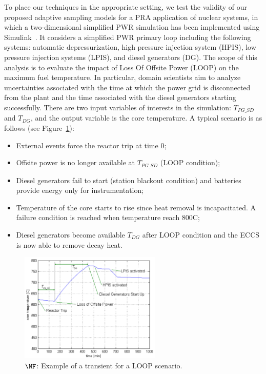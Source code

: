 To place our techniques in the appropriate setting, we test the validity of our proposed adaptive sampling models for a PRA application of nuclear systems, in which a two-dimensional simplified PWR simulation has been implemented using Simulink~\cite{MandelliSmith2012}.
%
It considers a simplified PWR primary loop including the following systems: automatic depressurization, high pressure injection system (HPIS), low pressure injection systems (LPIS), and diesel generators (DG).
%
The scope of this analysis is to evaluate the impact of Loss Of Offsite Power (LOOP) on the maximum fuel temperature.
%
In particular, domain scientists aim to analyze uncertainties associated with the time at which the power grid is disconnected from the plant and the time associated with the diesel generators starting successfully.
%
There are two input variables of interests in the simulation: $T_{PG\_SD}$ and $T_{DG}$, and the output variable is the core temperature.
%
A typical scenario is as follows (see Figure~\ref{fig:nuclearTransient}):
\begin{itemize} \denselist
  \item External events force the reactor trip at time $0$;
  \item Offsite power is no longer available at $T_{PG\_SD}$ (LOOP condition);
  \item Diesel generators fail to start (station blackout condition) and batteries provide energy only for instrumentation;
  \item Temperature of the core starts to rise since heat removal is incapacitated. A failure condition is reached when temperature reach 800C;
  \item Diesel generators become available $T_{DG}$ after LOOP condition and the ECCS is now able to remove decay heat.
\end{itemize}

\begin{figure}[!ht]
\centering
\includegraphics[width=0.6\textwidth]{figs/chap5/scenExample.pdf}
\caption{$\protect\NF$: Example of a transient for a LOOP scenario.}
\label{fig:nuclearTransient}
\end{figure}

